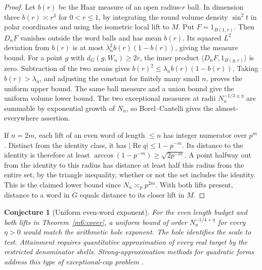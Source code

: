 \documentclass[11pt,reqno]{amsart}
\newtheorem{conjecture}[theorem]{Conjecture}
\theoremstyle{definition}
\theoremstyle{remark}
\numberwithin{equation}{section}
\newcommand{\re}{\operatorname{Re}}
\begin{document}
\begin{proof}
Let \(b(r)\) be the Haar measure of an open radius-\(r\) ball. In
dimension three \(b(r)\asymp r^3\) for \(0<r\le1\), by integrating
the round volume density \(\sin^2 t\) in polar coordinates and
using the isometric local lift to \(M\). Put \(F=1_{B(1,r)}\).
Then \(D_nF\) vanishes outside the word balls and has mean \(b(r)\).
Its squared \(L^2\) deviation from \(b(r)\) is at most
\(\lambda_n^2 b(r)(1-b(r))\), giving the measure bound.
For a point \(g\) with \(d_G(g,W_n)\ge 2r\), the inner product
\(\langle D_nF,1_{B(g,r)}\rangle\) is zero. Subtraction of the two
means gives \(b(r)^2\le\lambda_n b(r)(1-b(r))\). Taking
\(b(r)>\lambda_n\), and adjusting the constant for finitely many
small \(n\), proves the uniform upper bound. The same ball measure
and a union bound give the uniform volume lower bound. The two
exceptional measures at radii \(N_n^{-1/3\pm\eta}\) are summable
by exponential growth of \(N_n\), so Borel--Cantelli gives the
almost-everywhere assertion.

If \(n=2m\), each lift of an even word of length \(\le n\) has integer
numerator over \(p^m\). Distinct from the identity class, it has
\(|\re q|\le1-p^{-m}\). Its distance to the identity is therefore
at least \(\arccos(1-p^{-m})\ge\sqrt{2p^{-m}}\).
A point halfway out from the identity to this radius has distance
at least half this radius from the entire set, by the triangle
inequality, whether or not the set includes the identity. This is
the claimed lower bound since \(N_n\asymp_p p^{2m}\).
With both lifts present, distance to a word in \(G\) equals distance
to its closer lift in \(M\).
\end{proof}

\begin{conjecture}[Uniform even-word exponent]\label{m6:cover-conjecture}
For the even length budget and both lifts in
Theorem~\ref{m6:cover}, a uniform bound of order
\(N_n^{-1/4+\eta}\) for every \(\eta>0\) would match the arithmetic
hole exponent. The hole identifies the scale to test. Attainment
requires quantitative approximation of every real target by the
restricted denominator shells. Strong-approximation methods for
quadratic forms address this type of exceptional-cap problem
\cite{m6:Sardari,m6:PS}.
\end{conjecture}
\end{document}
